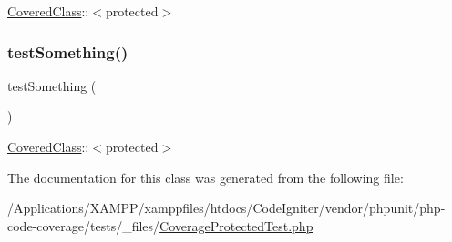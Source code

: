 \mbox{\hyperlink{class_covered_class}{Covered\+Class}}\+:\+:$<$protected$>$ \mbox{\label{class_coverage_protected_test_a0fc4e17369bc9607ebdd850d9eda8167}} 
\subsubsection{\texorpdfstring{test\+Something()}{testSomething()}\hspace{0.1cm}{\footnotesize\ttfamily [2/2]}}
{\footnotesize\ttfamily test\+Something (\begin{DoxyParamCaption}{ }\end{DoxyParamCaption})}

\mbox{\hyperlink{class_covered_class}{Covered\+Class}}\+:\+:$<$protected$>$ 

The documentation for this class was generated from the following file\+:\begin{DoxyCompactItemize}
\item 
/\+Applications/\+X\+A\+M\+P\+P/xamppfiles/htdocs/\+Code\+Igniter/vendor/phpunit/php-\/code-\/coverage/tests/\+\_\+files/\mbox{\hyperlink{php-code-coverage_2tests_2__files_2_coverage_protected_test_8php}{Coverage\+Protected\+Test.\+php}}\end{DoxyCompactItemize}
